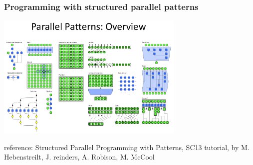 \begin{frame}
  \frametitle{Programming with structured parallel patterns}

  \begin{center}
  \includegraphics[width=9cm]{images/parallel_patterns2}
  \end{center}

  {\scriptsize
  reference: Structured Parallel Programming with Patterns, SC13 tutorial, by M. Hebenstreilt, J. reinders, A. Robison, M. McCool}

\end{frame}
